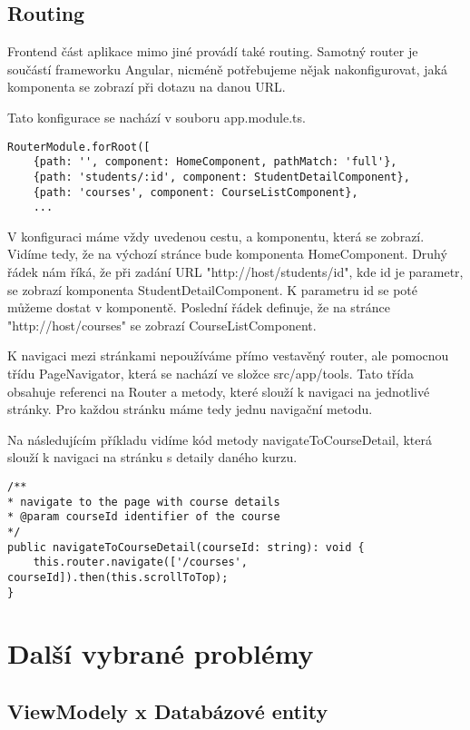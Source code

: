 \newpage

\subsection{Routing}

Frontend část aplikace mimo jiné provádí také routing. Samotný router je součástí frameworku Angular, nicméně potřebujeme nějak nakonfigurovat, jaká komponenta se zobrazí při dotazu na danou URL.

Tato konfigurace se nachází v souboru app.module.ts.
\lstset{style=typescript}
\begin{lstlisting}
RouterModule.forRoot([
	{path: '', component: HomeComponent, pathMatch: 'full'},
	{path: 'students/:id', component: StudentDetailComponent},
	{path: 'courses', component: CourseListComponent},
	...
\end{lstlisting}

V konfiguraci máme vždy uvedenou cestu, a komponentu, která se zobrazí.
Vidíme tedy, že na výchozí stránce bude komponenta HomeComponent. 
Druhý řádek nám říká, že při zadání URL "http://host/students/id", kde id je parametr, se zobrazí komponenta StudentDetailComponent. K parametru id se poté můžeme dostat v komponentě.
Poslední řádek definuje, že na stránce "http://host/courses" se zobrazí CourseListComponent.

K navigaci mezi stránkami nepoužíváme přímo vestavěný router, ale pomocnou třídu PageNavigator, která se nachází ve složce src/app/tools. Tato třída obsahuje referenci na Router a metody, které slouží k navigaci na jednotlivé stránky. Pro každou stránku máme tedy jednu navigační metodu.

Na následujícím příkladu vidíme kód metody navigateToCourseDetail, která slouží k navigaci na stránku s detaily daného kurzu.
\begin{lstlisting}
/**
* navigate to the page with course details
* @param courseId identifier of the course
*/
public navigateToCourseDetail(courseId: string): void {
	this.router.navigate(['/courses', courseId]).then(this.scrollToTop);
}
\end{lstlisting}

\newpage

\section{Další vybrané problémy}

\subsection{ViewModely x Databázové entity}

